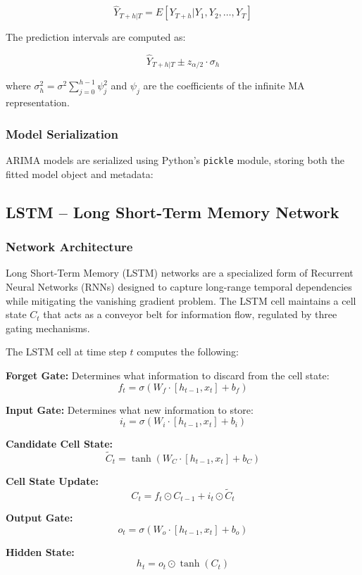 $$\hat{Y}_{T+h|T} = E[Y_{T+h} | Y_1, Y_2, \ldots, Y_T]$$

The prediction intervals are computed as:

$$\hat{Y}_{T+h|T} \pm z_{\alpha/2} \cdot \sigma_h$$

where $\sigma_h^2 = \sigma^2 \sum_{j=0}^{h-1} \psi_j^2$ and $\psi_j$ are the coefficients of the infinite MA representation.


\subsubsection{Model Serialization}

ARIMA models are serialized using Python's \texttt{pickle} module, storing both the fitted model object and metadata:



\subsection{LSTM -- Long Short-Term Memory Network}
\label{subsec:lstm}

\subsubsection{Network Architecture}

Long Short-Term Memory (LSTM) networks are a specialized form of Recurrent Neural Networks (RNNs) designed to capture long-range temporal dependencies while mitigating the vanishing gradient problem. The LSTM cell maintains a cell state $C_t$ that acts as a conveyor belt for information flow, regulated by three gating mechanisms.

The LSTM cell at time step $t$ computes the following:

\textbf{Forget Gate:} Determines what information to discard from the cell state:
$$f_t = \sigma(W_f \cdot [h_{t-1}, x_t] + b_f)$$

\textbf{Input Gate:} Determines what new information to store:
$$i_t = \sigma(W_i \cdot [h_{t-1}, x_t] + b_i)$$

\textbf{Candidate Cell State:}
$$\tilde{C}_t = \tanh(W_C \cdot [h_{t-1}, x_t] + b_C)$$

\textbf{Cell State Update:}
$$C_t = f_t \odot C_{t-1} + i_t \odot \tilde{C}_t$$

\textbf{Output Gate:}
$$o_t = \sigma(W_o \cdot [h_{t-1}, x_t] + b_o)$$

\textbf{Hidden State:}
$$h_t = o_t \odot \tanh(C_t)$$

